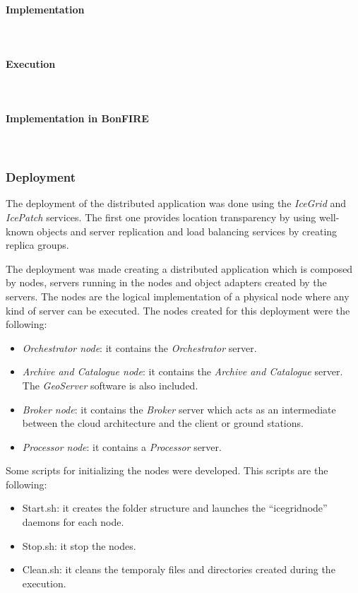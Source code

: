 \paragraph{Implementation}~\\

\paragraph{Execution}~\\

\paragraph{Implementation in BonFIRE}~\\



\subsubsection{Deployment}
\label{subsub:deployment}

The deployment of the distributed application was done using the \emph{IceGrid}
and \emph{IcePatch} services. 
The first one provides location transparency by using well-known objects and server replication and load
balancing services by creating replica groups. 

The deployment was made creating a distributed application which is composed by
nodes, servers running in the nodes and object adapters created by the servers. 
The nodes are the logical implementation of a physical node where any kind of
server can be executed. The nodes created for this deployment were the
following:

\begin{itemize}
\item \emph{Orchestrator node}: it contains the \emph{Orchestrator} server.
\item \emph{Archive and Catalogue node}: it contains the \emph{Archive and Catalogue}
  server. The \emph{GeoServer} software is also included.
\item \emph{Broker node}: it contains the \emph{Broker} server which acts as an
  intermediate between the cloud architecture and the client or ground stations.
\item \emph{Processor node}: it contains a \emph{Processor} server. 
\end{itemize}


Some scripts for initializing the nodes were developed. This scripts are the
following: 
\begin{itemize}
\item Start.sh: it creates the folder structure and launches the
  ``icegridnode'' daemons for each node.
\item Stop.sh: it stop the nodes.
\item Clean.sh: it cleans the temporaly files and directories created during the execution.
\end{itemize}


